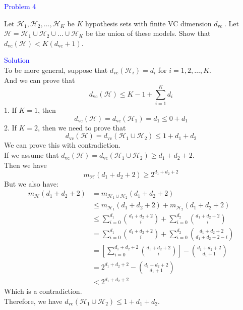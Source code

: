 \textcolor{blue}{Problem 4}

Let $\mathcal{H}_1, \mathcal{H}_2, \ldots, \mathcal{H}_K$ be $K$ hypothesis sets with finite VC dimension $d_{\text {vc }}$. Let $\mathcal{H}=\mathcal{H}_1 \cup \mathcal{H}_2 \cup \ldots \cup \mathcal{H}_K$ be the union of these models. Show that $d_{\mathrm{vc}}(\mathcal{H})<K\left(d_{\mathrm{vc}}+1\right)$.

\textcolor{blue}{Solution}\\
To be more general, suppose that $d_{\text{vc}}(\mathcal{H}_i)=d_i$ for $i=1,2,\ldots,K$.\\
And we can prove that
$$d_{\text{vc}}(\mathcal{H})\leq K-1+\sum_{i=1}^{K}d_i$$
1. If $K=1$, then
$$d_{\text{vc}}(\mathcal{H})=d_{\text{vc}}(\mathcal{H}_1)=d_1\leq 0 + d_1$$
2. If $K=2$, then we need to prove that
$$d_{\text{vc}}(\mathcal{H})=d_{\text{vc}}(\mathcal{H}_1\cup\mathcal{H}_2)\leq 1+d_1+d_2$$
We can prove this with contradiction.\\
If we assume that $d_{\text{vc}}(\mathcal{H})=d_{\text{vc}}(\mathcal{H}_1\cup\mathcal{H}_2)\geq d_1+d_2+2$.\\
Then we have
$$m_{\mathcal{H}}(d_1+d_2+2)\geq 2^{d_1+d_2+2}$$
But we also have:
\begin{align*}
    m_{\mathcal{H}}(d_1+d_2+2) &= m_{\mathcal{H}_1\cup\mathcal{H}_2}(d_1+d_2+2) \\
    &\leq m_{\mathcal{H}_1}(d_1+d_2+2) + m_{\mathcal{H}_2}(d_1+d_2+2) \\
    &\leq \sum_{i=0}^{d_1} \binom{d_1+d_2+2}{i} + \sum_{i=0}^{d_2} \binom{d_1+d_2+2}{i} \\
    &= \sum_{i=0}^{d_1} \binom{d_1+d_2+2}{i} + \sum_{i=0}^{d_2} \binom{d_1+d_2+2}{d_1+d_2+2-i} \\
    &= \left[\sum_{i=0}^{d_1+d_2+2} \binom{d_1+d_2+2}{i}\right] - \binom{d_1+d_2+2}{d_1+1} \\
    &= 2^{d_1+d_2+2} - \binom{d_1+d_2+2}{d_1+1} \\
    &< 2^{d_1+d_2+2}
\end{align*}
Which is a contradiction.\\
Therefore, we have $d_{\text{vc}}(\mathcal{H}_1\cup\mathcal{H}_2)\leq 1+d_1+d_2$.

